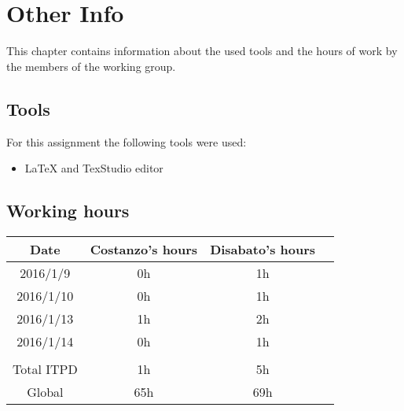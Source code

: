 \documentclass[\mainpath/main]{subfiles}
\begin{document}
\chapter{Other Info}
\label{OtherInfo}

\setmyfancystyle

This chapter contains information about the used tools and the hours of work by the members of the working group.

\section{Tools}
For this assignment the following tools were used:
\begin{itemize}
	\item \LaTeX{} and TexStudio editor
\end{itemize}

\section{Working hours}
\begin{table}[h!]
	\centering
\begin{tabular}{cccc}
\hline
Date       & Costanzo's hours & Disabato's hours  & \\ \hline
2016/1/9 & 0h 			  & 1h 			  & \\ \hline
2016/1/10 & 0h 			  & 1h 			  & \\ \hline
2016/1/13 & 1h 			  & 2h 			  & \\ \hline
2016/1/14 & 0h 			  & 1h 			  & \\ \hline

\\
Total ITPD  & 1h 		      & 5h 			 	  & \\ \hline
Global 	   & 65h 		 	  & 69h 			  & \\ \hline

\end{tabular}
\end{table}
\end{document}
